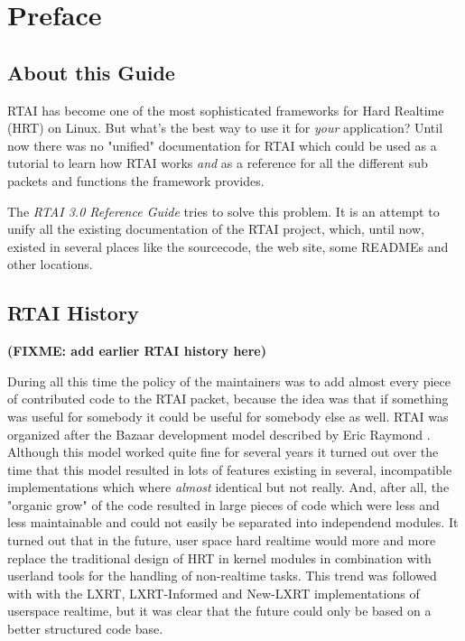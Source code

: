 \chapter{Preface}
\label{chap:preface}


\section{About this Guide}
\label{sec:preface:about}

RTAI has become one of the most sophisticated frameworks for Hard
Realtime (HRT) on Linux. But what's the best way to use it for \emph{your}
application? Until now there was no "unified" documentation for RTAI which 
could be used as a tutorial to learn how RTAI works \emph{and} as a
reference for all the different sub packets and functions the framework
provides. 

The \emph{RTAI 3.0 Reference Guide} tries to solve this problem. It is
an attempt to unify all the existing documentation of the RTAI project,
which, until now, existed in several places like the sourcecode, the web
site, some READMEs and other locations.


\section{RTAI History}
\label{sec:preface:hist}

\textbf{(FIXME: add earlier RTAI history here)}

During all this time the policy of the maintainers was to add almost
every piece of contributed code to the RTAI packet, because the idea was 
that if something was useful for somebody it could be useful for somebody 
else as well. RTAI was organized after the Bazaar development model described 
by Eric Raymond \cite{Raymond:CatBazaar}. Although this model worked quite fine 
for several years it turned out over the time that this model resulted in lots 
of features existing in several, incompatible implementations which where 
\emph{almost} identical but not really. And, after all, the "organic grow" 
of the code resulted in large pieces of code which were less and less 
maintainable and could not easily be separated into independend modules.
It turned out that in the future, user space hard realtime would more
and more replace the traditional design of HRT in kernel modules in
combination with userland tools for the handling of non-realtime tasks.
This trend was followed with with the LXRT, LXRT-Informed and New-LXRT
implementations of userspace realtime, but it was clear that the future 
could only be based on a better structured code base. 

